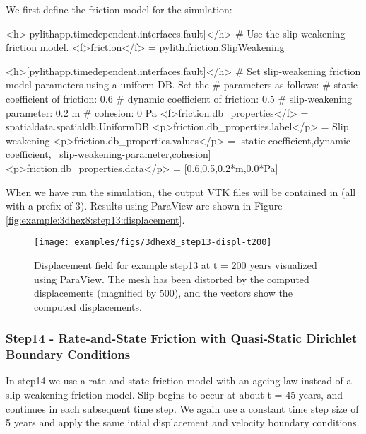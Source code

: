 We first define the friction model for the simulation:
\begin{cfg}
<h>[pylithapp.timedependent.interfaces.fault]</h>
# Use the slip-weakening friction model.
<f>friction</f> = pylith.friction.SlipWeakening

<h>[pylithapp.timedependent.interfaces.fault]</h>
# Set slip-weakening friction model parameters using a uniform DB. Set the
# parameters as follows:
# static coefficient of friction: 0.6
# dynamic coefficient of friction: 0.5
# slip-weakening parameter: 0.2 m
# cohesion: 0 Pa
<f>friction.db_properties</f> = spatialdata.spatialdb.UniformDB
<p>friction.db_properties.label</p> = Slip weakening
<p>friction.db_properties.values</p> = [static-coefficient,dynamic-coefficient, \
   slip-weakening-parameter,cohesion]
<p>friction.db_properties.data</p> = [0.6,0.5,0.2{*}m,0.0{*}Pa]
\end{cfg}
When we have run the simulation, the output VTK files will be contained
in \filename{examples/3d/hex8/output} (all with a prefix of 3).
Results using ParaView are shown in Figure \vref{fig:example:3dhex8:step13:displacement}.

\begin{figure}
  \texttt{[image: examples/figs/3dhex8\_step13-displ-t200]}
  \caption{Displacement field for example step13 at t = 200 years visualized
    using ParaView. The mesh has been distorted by the computed displacements
    (magnified by 500), and the vectors show the computed displacements.}
  \label{fig:example:3dhex8:step13:displacement}
\end{figure}


\subsubsection{Step14 - Rate-and-State Friction with Quasi-Static Dirichlet Boundary Conditions}

In step14 we use a rate-and-state friction model with an ageing law
instead of a slip-weakening friction model. Slip begins to occur at
about t = 45 years, and continues in each subsequent time step. We
again use a constant time step size of 5 years and apply the same
intial displacement and velocity boundary conditions.

